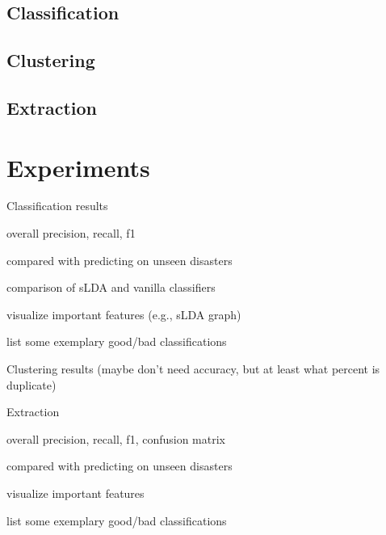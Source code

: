 \documentclass{article}
\begin{document}
\subsection{Classification}

\subsection{Clustering}

\subsection{Extraction}



\section{Experiments}
\begin{outline}
  \item Classification results
    \begin{outline}
      \item overall precision, recall, f1
      \item compared with predicting on unseen disasters
      \item comparison of sLDA and vanilla classifiers
      \item visualize important features (e.g., sLDA graph)
      \item list some exemplary good/bad classifications
    \end{outline}
  \item Clustering results (maybe don't need accuracy, but at least what percent is duplicate)
  \item Extraction
    \begin{outline}
      \item overall precision, recall, f1, confusion matrix
      \item compared with predicting on unseen disasters
      \item visualize important features
      \item list some exemplary good/bad classifications
    \end{outline}
\end{outline}
\end{document}
